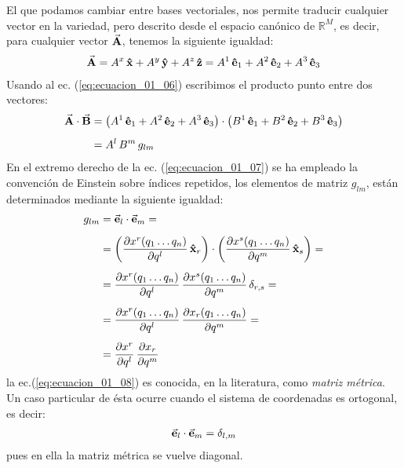 \documentclass[12pt]{article}
\begin{document}
\par
El que podamos cambiar entre bases vectoriales, nos permite traducir cualquier vector en la variedad,
pero descrito desde el espacio canónico de $\mathbb{R}^{M}$, es decir, para cualquier vector $\va{A}$, tenemos la siguiente igualdad:
\begin{align}
\va{A} = A^{x} \, \vu{x} + A^{y} \, \vu{y} + A^{z} \, \vu{z} = A^{1} \, \vu{e}_{1} + A^{2} \, \vu{e}_{2} + A^{3} \, \vu{e}_{3}
\label{eq:ecuacion_01_06}
\end{align}
Usando al ec. (\ref{eq:ecuacion_01_06}) escribimos el producto punto entre dos vectores:
\begin{align}
\begin{aligned}
\va{A} \cdot \va{B} &= \left( A^{1} \, \vu{e}_{1} + A^{2} \, \vu{e}_{2} + A^{3} \, \vu{e}_{3} \right) \cdot \left( B^{1} \, \vu{e}_{1} + B^{2} \, \vu{e}_{2} + B^{3} \, \vu{e}_{3} \right) \\[0.5em]
&= A^{l} \, B^{m} \, g_{lm}
\end{aligned}
\label{eq:ecuacion_01_07}
\end{align}
En el extremo derecho de la ec. (\ref{eq:ecuacion_01_07}) se ha empleado la convención de Einstein sobre índices repetidos, los elementos de matriz $g_{lm}$, están determinados mediante la siguiente igualdad:
\begin{align}
\begin{aligned}[b]
g_{lm} &= \va{e}_{l} \cdot \va{e}_{m} = \\[0.5em]
&= \left( \pdv{x^{r} (q_{1} \ldots q_{n})}{q^{l}} \, \vu{x}_{r} \right) \cdot \left( \pdv{x^{s} (q_{1} \ldots q_{n})}{q^{m}} \, \vu{x}_{s} \right) = \\[0.5em]
&= \pdv{x^{r} (q_{1} \ldots q_{n})}{q^{l}} \, \pdv{x^{s} (q_{1} \ldots q_{n})}{q^{m}} \, \delta_{r,s} = \\[0.5em]
&= \pdv{x^{r} (q_{1} \ldots q_{n})}{q^{l}} \, \pdv{x_{r} (q_{1} \ldots q_{n})}{q^{m}} = \\[0.5em]
&= \pdv{x^{r}}{q^{l}} \, \pdv{x_{r}}{q^{m}}
\end{aligned}
\label{eq:ecuacion_01_08}
\end{align}
la ec.(\ref{eq:ecuacion_01_08}) es conocida, en la literatura, como \emph{matriz métrica}. Un caso particular de ésta ocurre cuando el sistema de coordenadas es ortogonal, es decir: 
\begin{align*}
\va{e}_{l} \cdot \va{e}_{m} = \delta_{l,m}
\end{align*}
pues en ella la matriz métrica se vuelve diagonal.
\end{document}
